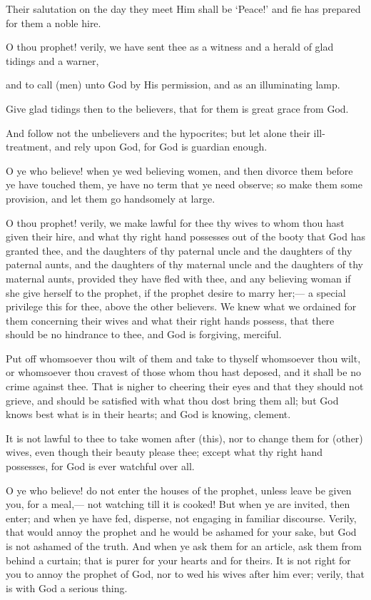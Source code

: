 \documentclass[fontsize=14pt, letterpaper, notitlepage, openany, DIV=12]{scrbook} %
\begin{document}
\noindent[33:44]
Their salutation on the day they meet Him shall be `Peace!' and fie has prepared for them
a noble hire.

\noindent[33:45]
O thou prophet! verily, we have sent thee as a witness and a herald of glad tidings and a
warner,

\noindent[33:46]
and to call (men) unto God by His permission, and as an illuminating lamp.

\noindent[33:47]
Give glad tidings then to the believers, that for them is great grace from God.

\noindent[33:48]
And follow not the unbelievers and the hypocrites; but let alone their ill-treatment, and
rely upon God, for God is guardian enough.

\noindent[33:49]
O ye who believe! when ye wed believing women, and then divorce them before ye have
touched them, ye have no term that ye need observe; so make them some provision, and let them
go handsomely at large.

\noindent[33:50]
O thou prophet! verily, we make lawful for thee thy wives to whom thou hast given their
hire, and what thy right hand possesses out of the booty that God has granted thee, and the
daughters of thy paternal uncle and the daughters of thy paternal aunts, and the daughters of thy
maternal uncle and the daughters of thy maternal aunts, provided they have fled with thee, and
any believing woman if she give herself to the prophet, if the prophet desire to marry her;--- a
special privilege this for thee, above the other believers. We knew what we ordained for them
concerning their wives and what their right hands possess, that there should be no hindrance to
thee, and God is forgiving, merciful.

\noindent[33:51]
Put off whomsoever thou wilt of them and take to thyself whomsoever thou wilt, or
whomsoever thou cravest of those whom thou hast deposed, and it shall be no crime against thee.
That is nigher to cheering their eyes and that they should not grieve, and should be satisfied with
what thou dost bring them all; but God knows best what is in their hearts; and God is knowing,
clement.

\noindent[33:52]
It is not lawful to thee to take women after (this), nor to change them for (other) wives,
even though their beauty please thee; except what thy right hand possesses, for God is ever
watchful over all.

\noindent[33:53]
O ye who believe! do not enter the houses of the prophet, unless leave be given you, for a
meal,--- not watching till it is cooked! But when ye are invited, then enter; and when ye have fed,
disperse, not engaging in familiar discourse. Verily, that would annoy the prophet and he would
be ashamed for your sake, but God is not ashamed of the truth. And when ye ask them for an
article, ask them from behind a curtain; that is purer for your hearts and for theirs. It is not right
for you to annoy the prophet of God, nor to wed his wives after him ever; verily, that is with God
a serious thing.
\end{document}
